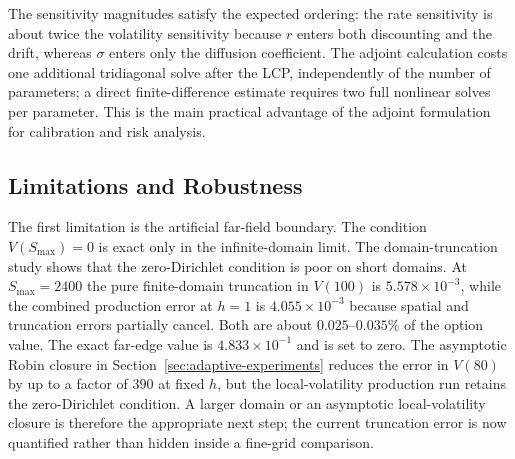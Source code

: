 \documentclass[11pt,a4paper]{article}
\theoremstyle{definition}
\theoremstyle{remark}
\begin{document}
\begin{table}[H]
\centering
{}
\caption{Discrete adjoint sensitivities of $V(100)$ at $N=4800$. The adjoint
and the direct full-LCP finite differences agree to better than
$2\times10^{-9}$. The exact derivative is available only for the
constant-volatility benchmark; it isolates the common spatial error of both
numerical derivatives. The signs agree with the financial interpretation:
higher volatility and dividend yield raise the put value, while a higher
risk-free rate lowers it.}
\label{tab:adjoint}
\end{table}

The sensitivity magnitudes satisfy the expected ordering: the rate
sensitivity is about twice the volatility sensitivity because $r$ enters
both discounting and the drift, whereas $\sigma$ enters only the diffusion
coefficient. The adjoint calculation costs one additional tridiagonal solve
after the LCP, independently of the number of parameters; a direct
finite-difference estimate requires two full nonlinear solves per parameter.
This is the main practical advantage of the adjoint formulation for
calibration and risk analysis.

\subsection{Limitations and Robustness}
The first limitation is the artificial far-field boundary. The condition
$V(S_{\max})=0$ is exact only in the infinite-domain limit. The
domain-truncation study shows that the zero-Dirichlet condition is poor on
short domains. At $S_{\max}=2400$ the pure finite-domain truncation in
\(V(100)\) is $5.578\times10^{-3}$, while the combined production error at
$h=1$ is $4.055\times10^{-3}$ because spatial and truncation errors partially
cancel. Both are about $0.025$--$0.035\%$ of the option value. The exact
far-edge value is $4.833\times10^{-1}$ and is set to zero. The asymptotic
Robin closure in
Section~\ref{sec:adaptive-experiments} reduces the error in \(V(80)\) by up
to a factor of $390$ at fixed $h$, but the local-volatility production run
retains the zero-Dirichlet condition. A larger domain or an asymptotic
local-volatility closure is therefore the appropriate next step; the
current truncation error is now quantified rather than hidden inside a
fine-grid comparison.
\end{document}
